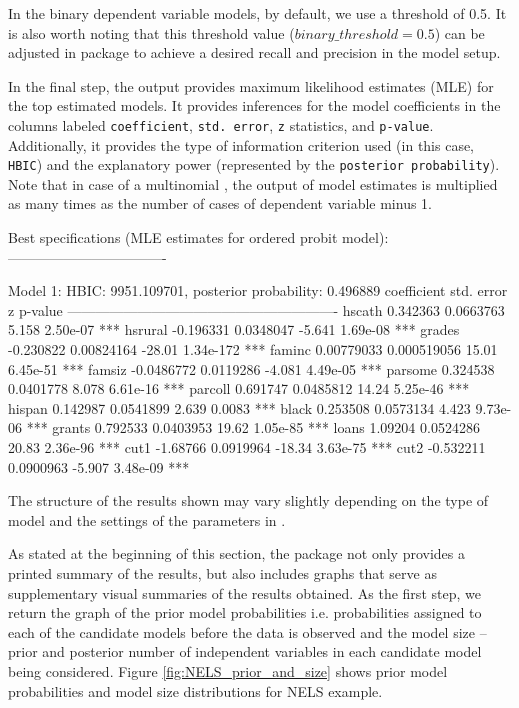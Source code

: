 In the binary dependent variable models, by default, we use a
threshold of 0.5. It is also worth noting that  this threshold
value ($binary\_threshold = 0.5$) can be adjusted in 
package to achieve a desired recall and precision in the model setup.

In the final step, the output provides maximum likelihood
estimates (MLE) for the top estimated models. It provides
inferences for the model  coefficients in the columns labeled
\texttt{coefficient}, \texttt{std. error}, \texttt{z} statistics,
and \texttt{p-value}. Additionally, it provides the type of
information criterion used (in this case, \texttt{HBIC}) and the
explanatory power (represented by the \texttt{posterior probability}).
Note that in case of a multinomial ,
the output of model estimates is multiplied as many times
as the number of cases of dependent variable minus 1.
\begin{CodeChunk}\begin{CodeOutput}
Best specifications (MLE estimates for ordered probit model):
----------------------------------

Model 1: HBIC: 9951.109701, posterior probability: 0.496889
coefficient   std. error       z       p-value 
----------------------------------------------------------
hscath      0.342363     0.0663763       5.158   2.50e-07  ***
hsrural    -0.196331     0.0348047      -5.641   1.69e-08  ***
grades     -0.230822     0.00824164    -28.01    1.34e-172 ***
faminc      0.00779033   0.000519056    15.01    6.45e-51  ***
famsiz     -0.0486772    0.0119286      -4.081   4.49e-05  ***
parsome     0.324538     0.0401778       8.078   6.61e-16  ***
parcoll     0.691747     0.0485812      14.24    5.25e-46  ***
hispan      0.142987     0.0541899       2.639   0.0083    ***
black       0.253508     0.0573134       4.423   9.73e-06  ***
grants      0.792533     0.0403953      19.62    1.05e-85  ***
loans       1.09204      0.0524286      20.83    2.36e-96  ***
cut1       -1.68766      0.0919964     -18.34    3.63e-75  ***
cut2       -0.532211     0.0900963      -5.907   3.48e-09  ***
\end{CodeOutput}
\end{CodeChunk}

The structure of the results shown may vary slightly
depending on the type of model and the settings of
the parameters in .

As stated at the beginning of this section, the
\label{sec:bace_plots} package not only provides
a printed summary of the results, but also includes graphs
that serve as supplementary visual summaries of the results
obtained. As the first step, we return the graph of the prior
model probabilities  i.e. probabilities assigned to each of
the candidate models before the data is observed and the
model size -- prior and posterior number of independent variables
in each candidate model being considered. Figure \ref{fig:NELS_prior_and_size}
shows prior model probabilities and model size distributions
for NELS example.

